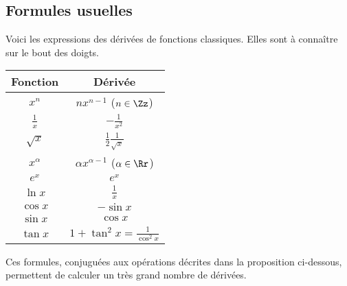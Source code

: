 \documentclass[11pt,class=report,crop=false]{standalone}
\begin{document}
\subsection{Formules usuelles}

Voici les expressions des dérivées de fonctions classiques. Elles sont à connaître sur le bout des doigts.

\begin{center}
\setlength{\arrayrulewidth}{0.05mm}
\begin{tabular}[t]{|c|c@{\vrule depth 1.2ex height 3ex width 0mm \ }|}
\hline
\textbf{Fonction}         & \textbf{Dérivée} \\ \hline
   $x^n$         & $nx^{n-1}$  \quad ($n \in \Zz$)   \\ \hline
   $\frac 1x$    & $-\frac{1}{x^2}$              \\ \hline
   $\sqrt{x}$    & $\frac12 \frac1{\sqrt{x}}$   \\ \hline
   $x^\alpha$   & $\alpha x^{\alpha-1}$  \quad ($\alpha\in\Rr$)  \\ \hline
   $e^x$         & $e^x$                        \\ \hline
   $\ln x$       & $\frac 1x$                   \\ \hline
   $\cos x$      & $-\sin x$                    \\ \hline
   $\sin x$      & $\cos x$                     \\ \hline
   $\tan x$      & $1+\tan^2 x = \frac{1}{\cos^2 x}$        \\ \hline
\end{tabular}
\end{center}

Ces formules, conjuguées aux opérations décrites dans la proposition ci-dessous, permettent de calculer un très grand nombre de dérivées.
\end{document}

